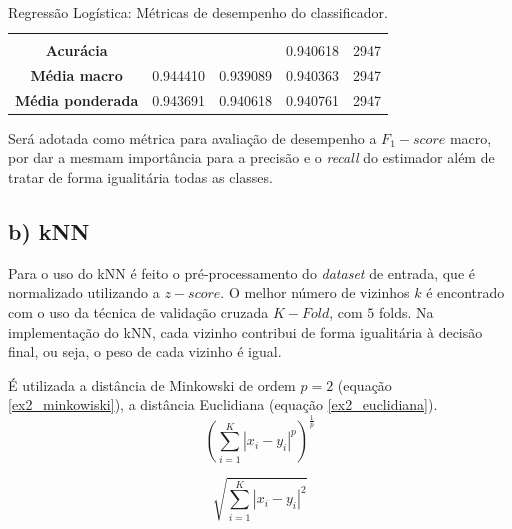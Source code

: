 \documentclass{article}
\begin{document}
\begin{table}[H]
\begin{tabular}{ccccc}
        &  &  &  &  \\ \cline{2-5} 
        \multicolumn{1}{c|}{\textbf{Acurácia}} & \multicolumn{1}{c|}{} & \multicolumn{1}{c|}{} & \multicolumn{1}{c|}{0.940618} & \multicolumn{1}{c|}{2947} \\ \cline{2-5} 
        \multicolumn{1}{c|}{\textbf{Média macro}} & \multicolumn{1}{c|}{0.944410} & \multicolumn{1}{c|}{0.939089} & \multicolumn{1}{c|}{0.940363} & \multicolumn{1}{c|}{2947} \\ \cline{2-5} 
        \multicolumn{1}{c|}{\textbf{Média ponderada}} & \multicolumn{1}{c|}{0.943691} & \multicolumn{1}{c|}{0.940618} & \multicolumn{1}{c|}{0.940761} & \multicolumn{1}{c|}{2947} \\ \cline{2-5} 
        \end{tabular}
    \caption{Regressão Logística: Métricas de desempenho do classificador.}
    \label{table:ex2_desempenho}
    \end{table}
    Será adotada como métrica para avaliação de desempenho a $F_1-score$ macro, por dar a mesmam importância para a precisão e o 
    \textit{recall} do estimador além de tratar de forma igualitária todas as classes.
    
    \subsection[]{b) kNN}
    Para o uso do kNN é feito o pré-processamento do \textit{dataset} de entrada, que é normalizado utilizando a $z-score$.
    O melhor número de vizinhos $k$ é encontrado com o uso da técnica de validação cruzada $K-Fold$, com $5$ folds. Na implementação
    do kNN, cada vizinho contribui de forma igualitária à decisão final, ou seja, o peso de cada vizinho é igual.

    É utilizada a distância de Minkowski de ordem $p=2$ (equação \ref{ex2_minkowiski}), a distância Euclidiana (equação \ref{ex2_euclidiana}).
    \begin{equation}
        (\sum_{i=1}^{K}|x_i-y_i|^{p})^{\frac{1}{p}} \label{ex2_minkowiski}
    \end{equation}

    \begin{equation}
        \sqrt{\sum_{i=1}^{K}|x_i-y_i|^{2}} \label{ex2_euclidiana}
    \end{equation}
\end{document}
